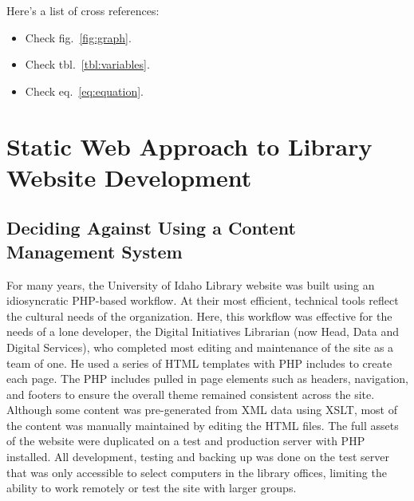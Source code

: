 \documentclass{book}
\providecommand{\tightlist}{%
  \setlength{\itemsep}{0pt}\setlength{\parskip}{0pt}}
\begin{document}
Here's a list of cross references:

\begin{itemize}
\tightlist
\item
  Check fig.~\ref{fig:graph}.
\item
  Check tbl.~\ref{tbl:variables}.
\item
  Check eq.~\ref{eq:equation}.
\end{itemize}

\hypertarget{static-web-approach-to-library-website-development}{%
\chapter{Static Web Approach to Library Website
Development}\label{static-web-approach-to-library-website-development}}

\hypertarget{deciding-against-using-a-content-management-system}{%
\section{Deciding Against Using a Content Management
System}\label{deciding-against-using-a-content-management-system}}

For many years, the University of Idaho Library website was built using an
idiosyncratic PHP-based workflow. At their most efficient, technical tools
reflect the cultural needs of the organization. Here, this workflow was
effective for the needs of a lone developer, the Digital Initiatives Librarian
(now Head, Data and Digital Services), who completed most editing and
maintenance of the site as a team of one. He used a series of HTML templates
with PHP includes to create each page. The PHP includes pulled in page
elements such as headers, navigation, and footers to ensure the overall theme
remained consistent across the site. Although some content was pre-generated
from XML data using XSLT, most of the content was manually maintained by
editing the HTML files. The full assets of the website were duplicated on a
test and production server with PHP installed. All development, testing and
backing up was done on the test server that was only accessible to select
computers in the library offices, limiting the ability to work remotely or
test the site with larger groups.
\end{document}
